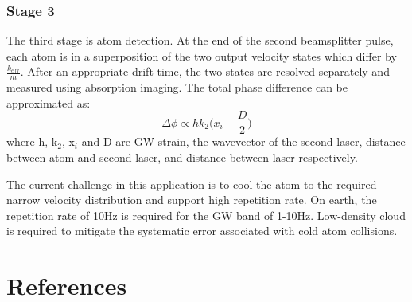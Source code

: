 \documentclass[conference]{IEEEtran}
\begin{document}
\subsubsection{Stage 3}
The third stage is atom detection. At the end of the second beamsplitter pulse, each atom is in a superposition of the two output velocity states which differ by $\frac{k_{eff}}{m}$. After an appropriate drift time, the two states are resolved separately and measured using absorption imaging. The total phase difference can be approximated as\cite{Dimopoulos_2008}:
\begin{equation}
\Delta \phi \propto hk_{2}\big(x_{i}-\frac{D}{2}\big)
\end{equation}
where h, k$_2$, x$_{i}$ and D are GW strain, the wavevector of the second laser, distance between atom and second laser, and distance between laser respectively.


The current challenge in this application is to cool the atom to the required narrow velocity distribution and support high repetition rate. On earth, the repetition rate of 10Hz is required for the GW band of 1-10Hz. Low-density cloud is required to mitigate the systematic error associated with cold atom collisions.  


\section{References}
\printbibliography[heading=none]
\end{document}
